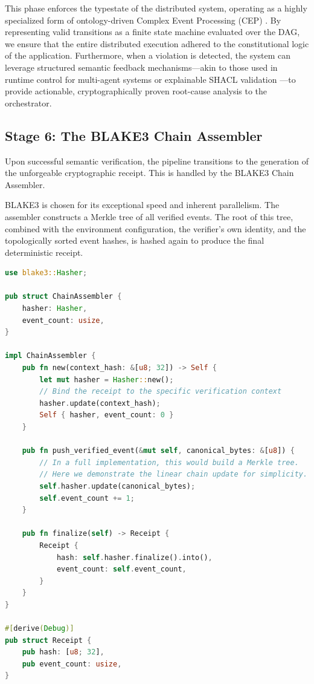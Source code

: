 This phase enforces the typestate of the distributed system, operating as a highly specialized form of ontology-driven Complex Event Processing (CEP) \cite{ref_RealTimeHealthA39}. By representing valid transitions as a finite state machine evaluated over the DAG, we ensure that the entire distributed execution adhered to the constitutional logic of the application. Furthermore, when a violation is detected, the system can leverage structured semantic feedback mechanisms---akin to those used in runtime control for multi-agent systems \cite{ref_OntologyBasedFe37} or explainable SHACL validation \cite{ref_xpSHACLExplaina36}---to provide actionable, cryptographically proven root-cause analysis to the orchestrator.

\subsection{Stage 6: The BLAKE3 Chain Assembler}
Upon successful semantic verification, the pipeline transitions to the generation of the unforgeable cryptographic receipt. This is handled by the BLAKE3 Chain Assembler.

BLAKE3 is chosen for its exceptional speed and inherent parallelism. The assembler constructs a Merkle tree of all verified events. The root of this tree, combined with the environment configuration, the verifier's own identity, and the topologically sorted event hashes, is hashed again to produce the final deterministic receipt.

\begin{lstlisting}[language=Rust, caption={BLAKE3 Merkle-based receipt generation}]
use blake3::Hasher;

pub struct ChainAssembler {
    hasher: Hasher,
    event_count: usize,
}

impl ChainAssembler {
    pub fn new(context_hash: &[u8; 32]) -> Self {
        let mut hasher = Hasher::new();
        // Bind the receipt to the specific verification context
        hasher.update(context_hash);
        Self { hasher, event_count: 0 }
    }

    pub fn push_verified_event(&mut self, canonical_bytes: &[u8]) {
        // In a full implementation, this would build a Merkle tree.
        // Here we demonstrate the linear chain update for simplicity.
        self.hasher.update(canonical_bytes);
        self.event_count += 1;
    }

    pub fn finalize(self) -> Receipt {
        Receipt {
            hash: self.hasher.finalize().into(),
            event_count: self.event_count,
        }
    }
}

#[derive(Debug)]
pub struct Receipt {
    pub hash: [u8; 32],
    pub event_count: usize,
}
\end{lstlisting}

